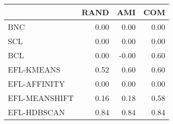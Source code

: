 \begin{tabular}{lrrr}
\toprule
 & RAND & AMI & COM \\
\midrule
BNC & 0.00 & 0.00 & 0.00 \\
SCL & 0.00 & 0.00 & 0.00 \\
BCL & 0.00 & -0.00 & 0.60 \\
EFL-KMEANS & 0.52 & 0.60 & 0.60 \\
EFL-AFFINITY & 0.00 & 0.00 & 0.00 \\
EFL-MEANSHIFT & 0.16 & 0.18 & 0.58 \\
EFL-HDBSCAN & 0.84 & 0.84 & 0.84 \\
\bottomrule
\end{tabular}
